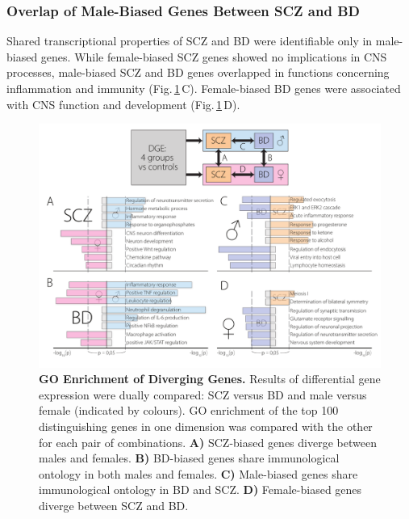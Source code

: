 \subsubsection{Overlap of Male-Biased Genes Between SCZ and BD}
Shared transcriptional properties of SCZ and BD were identifiable only in male-biased genes. While female-biased SCZ genes showed no implications in CNS processes, male-biased SCZ and BD genes overlapped in functions concerning inflammation and immunity (Fig.\,\ref{fig:scz-bd-go}\,C). Female-biased BD genes were associated with CNS function and development (Fig.\,\ref{fig:scz-bd-go}\,D).

\begin{figure}[ht]
\includegraphics[width=\textwidth]{figures/scz-bd-go}
\caption[GO Enrichment of Diverging Genes.]{\textbf{GO Enrichment of Diverging Genes.} Results of differential gene expression were dually compared: SCZ versus BD and male versus female (indicated by colours). GO enrichment of the top 100 distinguishing genes in one dimension was compared with the other for each pair of combinations. \textbf{A)} SCZ-biased genes diverge between males and females. \textbf{B)} BD-biased genes share immunological ontology in both males and females. \textbf{C)} Male-biased genes share immunological ontology in BD and SCZ. \textbf{D)} Female-biased genes diverge between SCZ and BD.
\label{fig:scz-bd-go}}
\end{figure}


